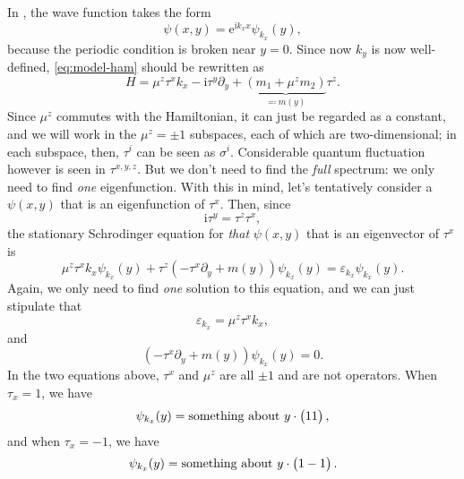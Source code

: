 \documentclass[hyperref, a4paper]{article}
\newcommand*{\ii}{\mathrm{i}}
\newcommand*{\ee}{\mathrm{e}}
\def\\{}%
\begin{document}
In , 
the wave function takes the form 
\begin{equation}
    \psi(x, y) = \ee^{\ii k_x x} \psi_{k_x}(y),
\end{equation}
because the periodic condition is broken near $y = 0$.
Since now $k_y$ is now well-defined, 
\eqref{eq:model-ham} should be rewritten as 
\begin{equation}
    H = \mu^z \tau^x k_x  - \ii \tau^y \partial_y + \underbrace{(m_1 + \mu^z m_2)}_{\eqqcolon m(y)} \tau^z.
\end{equation}
Since $\mu^z$ commutes with the Hamiltonian, 
it can just be regarded as a constant,
and we will work in the $\mu^z = \pm 1$ subspaces, 
each of which are two-dimensional;
in each subspace, then, 
$\tau^i$ can be seen as $\sigma^i$.
Considerable quantum fluctuation however is seen in $\tau^{x, y, z}$.
But we don't need to find the \emph{full} spectrum: 
we only need to find \emph{one} eigenfunction.
With this in mind, let's tentatively consider a $\psi(x, y)$
that is an eigenfunction of $\tau^x$.
Then, since 
\[
    \ii \tau^y = \tau^z \tau^x,
\]
the stationary Schrodinger equation for \emph{that} $\psi(x, y)$ 
that is an eigenvector of $\tau^x$ is 
\[
    \mu^z \tau^x k_x \psi_{k_x} (y) + \tau^z (- \tau^x \partial_y + m(y)) \psi_{k_x}(y) 
    = \varepsilon_{k_x} \psi_{k_x}(y).
\]
Again, we only need to find \emph{one} solution to this equation, 
and we can just stipulate that 
\begin{equation}
    \varepsilon_{k_x} = \mu^z \tau^x k_x,
    \label{eq:boundary-dispersion}
\end{equation}
and 
\begin{equation}
    (- \tau^x \partial_y + m(y)) \psi_{k_x}(y) = 0.
    \label{eq:boundary-state-eq}
\end{equation}
In the two equations above, $\tau^x$ and $\mu^z$ are all $\pm 1$
and are not operators.
When $\tau_x = 1$, we have 
\[
    \psi_{k_x}(y) = \text{something about $y$} \cdot \pmqty{1 \\ 1},
\]
and when $\tau_x = -1$, we have 
\[
    \psi_{k_x}(y) = \text{something about $y$} \cdot \pmqty{1 \\ - 1}.
\]
\end{document}
